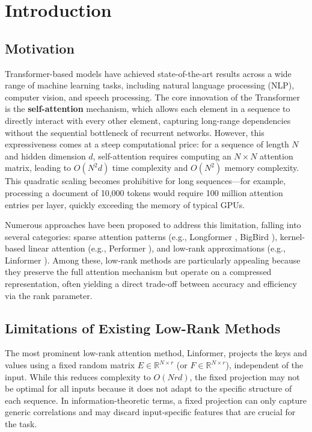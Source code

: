 \section{Introduction}
\subsection{Motivation}
Transformer-based models \cite{vaswani2017attention} have achieved state-of-the-art results across a wide range of machine learning tasks, including natural language processing (NLP), computer vision, and speech processing. The core innovation of the Transformer is the \textbf{self-attention} mechanism, which allows each element in a sequence to directly interact with every other element, capturing long-range dependencies without the sequential bottleneck of recurrent networks. However, this expressiveness comes at a steep computational price: for a sequence of length $N$ and hidden dimension $d$, self-attention requires computing an $N \times N$ attention matrix, leading to $O(N^2 d)$ time complexity and $O(N^2)$ memory complexity. This quadratic scaling becomes prohibitive for long sequences—for example, processing a document of 10,000 tokens would require 100 million attention entries per layer, quickly exceeding the memory of typical GPUs.

Numerous approaches have been proposed to address this limitation, falling into several categories: sparse attention patterns (e.g., Longformer \cite{beltagy2020longformer}, BigBird \cite{zaheer2020bigbird}), kernel-based linear attention (e.g., Performer \cite{choromanski2020rethinking}), and low-rank approximations (e.g., Linformer \cite{wang2020linformer}). Among these, low-rank methods are particularly appealing because they preserve the full attention mechanism but operate on a compressed representation, often yielding a direct trade-off between accuracy and efficiency via the rank parameter.

\subsection{Limitations of Existing Low-Rank Methods}
The most prominent low-rank attention method, Linformer, projects the keys and values using a fixed random matrix $E \in \mathbb{R}^{N \times r}$ (or $F \in \mathbb{R}^{N \times r}$), independent of the input. While this reduces complexity to $O(N r d)$, the fixed projection may not be optimal for all inputs because it does not adapt to the specific structure of each sequence. In information-theoretic terms, a fixed projection can only capture generic correlations and may discard input-specific features that are crucial for the task.

